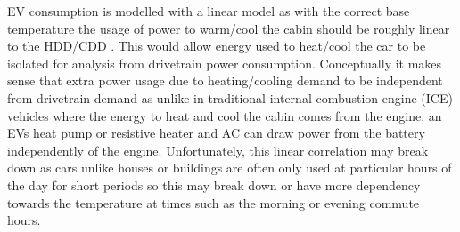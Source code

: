 \documentclass[
]{article}
\begin{document}
EV consumption is modelled with a linear model as with the correct base
temperature the usage of power to warm/cool the cabin should be roughly
linear to the HDD/CDD \cite{HDD_est}. This would allow energy used to
heat/cool the car to be isolated for analysis from drivetrain power
consumption. Conceptually it makes sense that extra power usage due to
heating/cooling demand to be independent from drivetrain demand as
unlike in traditional internal combustion engine (ICE) vehicles where
the energy to heat and cool the cabin comes from the engine, an EVs heat
pump or resistive heater and AC can draw power from the battery
independently of the engine. Unfortunately, this linear correlation may
break down as cars unlike houses or buildings are often only used at
particular hours of the day for short periods so this may break down or
have more dependency towards the temperature at times such as the
morning or evening commute hours.
\end{document}
